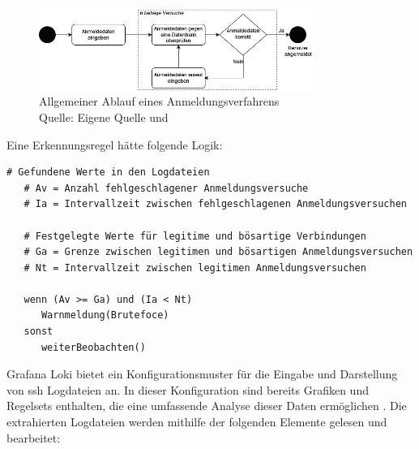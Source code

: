 
\begin{figure}[H]
   \centering
   \includegraphics[width=0.8\textwidth]{assets/Anmeldeverfahren.drawio.png}
   \caption{Allgemeiner Ablauf eines Anmeldungsverfahrens \\Quelle: Eigene Quelle und \citep{Selvaganesh_SplunkBruteForce}}
   \centering
\end{figure}

Eine Erkennungsregel hätte folgende Logik:
{
\begin{Verbatim}[frame=single]
   # Gefundene Werte in den Logdateien
   # Av = Anzahl fehlgeschlagener Anmeldungsversuche
   # Ia = Intervallzeit zwischen fehlgeschlagenen Anmeldungsversuchen

   # Festgelegte Werte für legitime und bösartige Verbindungen
   # Ga = Grenze zwischen legitimen und bösartigen Anmeldungsversuchen
   # Nt = Intervallzeit zwischen legitimen Anmeldungsversuchen

   wenn (Av >= Ga) und (Ia < Nt)
      Warnmeldung(Brutefoce)
   sonst
      weiterBeobachten()
\end{Verbatim}
}

\newpage
Grafana Loki bietet ein Konfigurationsmuster für die Eingabe und Darstellung von \gls{ssh} Logdateien an. In dieser Konfiguration sind bereits Grafiken und Regelsets enthalten, die eine umfassende Analyse dieser Daten ermöglichen \citep{VoidQuark_sshlogs}. Die extrahierten Logdateien werden mithilfe der folgenden Elemente gelesen und bearbeitet:


